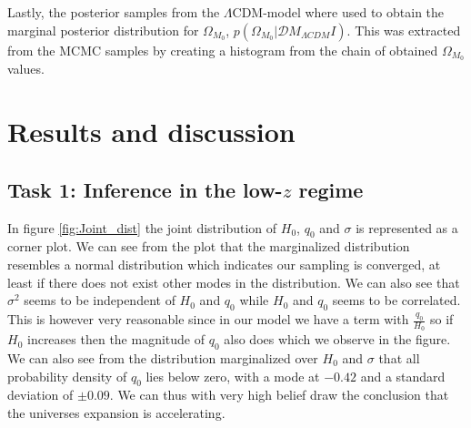 \documentclass[11pt,a4paper]{article}
\begin{document}
Lastly, the posterior samples from the $\Lambda$CDM-model where used to obtain the marginal posterior distribution for $\Omega_{M_0}$, $p\left(\Omega_{M_0}\vert \mathcal{D} M_{\Lambda CDM} I\right)$. This was extracted from the MCMC samples by creating a histogram from the chain of obtained $\Omega_{M_0}$ values.

\section{Results and discussion}

\subsection[Task 1]{Task 1: Inference in the low-$z$ regime}
In figure \ref{fig:Joint_dist} the joint distribution of $H_0$, $q_0$ and $\sigma$ is represented as a corner plot. We can see from the plot that  the marginalized distribution resembles a normal distribution which indicates our sampling is converged, at least if there does not exist other modes in the distribution. We can also see that $\sigma^2$ seems to be independent of $H_0$ and $q_0$ while $H_0$ and $q_0$ seems to be correlated. This is however very reasonable since in our model we have a term with $\frac{q_0}{H_0}$ so if $H_0$ increases then the magnitude of $q_0$ also does which we observe in the figure. We can also see from the distribution marginalized  over $H_0$ and $\sigma$ that all probability density of $q_0$ lies below zero, with a mode at $-0.42$ and a standard deviation of $\pm 0.09$. We can thus with very high belief draw the conclusion that the universes expansion is accelerating.  
\end{document}
